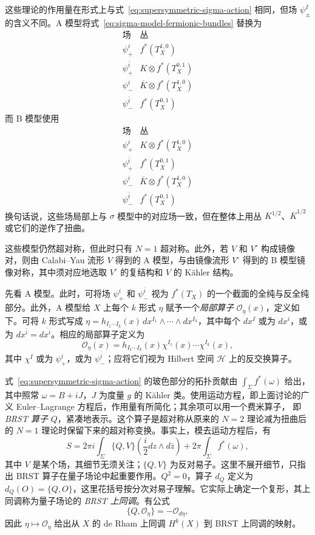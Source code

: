 这些理论的作用量在形式上与式~\eqref{eq:supersymmetric-sigma-action} 相同，但场 $\psi_\pm^I$ 的含义不同。A 模型将式~\eqref{eq:sigma-model-fermionic-bundles} 替换为
\[
\begin{array}{c|l}
\text{场}&\text{丛}\\\hline
\psi_+^i&f^*(T_X^{1,0})\\
\psi_+^{\bar i}&K\otimes f^*(T_X^{0,1})\\
\psi_-^i&\overline K\otimes f^*(T_X^{1,0})\\
\psi_-^{\bar i}&f^*(T_X^{0,1})
\end{array}
\]
而 B 模型使用
\[
\begin{array}{c|l}
\text{场}&\text{丛}\\\hline
\psi_+^i&K\otimes f^*(T_X^{1,0})\\
\psi_+^{\bar i}&f^*(T_X^{0,1})\\
\psi_-^i&\overline K\otimes f^*(T_X^{1,0})\\
\psi_-^{\bar i}&f^*(T_X^{0,1})
\end{array}
\]
换句话说，这些场局部上与 $\sigma$ 模型中的对应场一致，但在整体上用丛 $K^{1/2}$、$\overline K^{1/2}$ 或它们的逆作了扭曲。

这些模型仍然超对称，但此时只有 $N=1$ 超对称。此外，若 $V$ 和 $V^\circ$ 构成镜像对，则由 Calabi--Yau 流形 $V$ 得到的 A 模型，与由镜像流形 $V^\circ$ 得到的 B 模型镜像对称，其中须对应地选取 $V^\circ$ 的复结构和 $V$ 的 Kähler 结构。

先看 A 模型。此时，可将场 $\psi_+^i$ 和 $\psi_-^{\bar i}$ 视为 $f^*(T_X)$ 的一个截面的全纯与反全纯部分。此外，A 模型给 $X$ 上每个 $k$ 形式 $\eta$ 赋予一个\emph{局部算子} $\mathcal O_\eta(x)$，定义如下。可将 $k$ 形式写成 $\eta=h_{I_1\cdots I_k}(x)\,dx^{I_1}\wedge\cdots\wedge dx^{I_k}$，其中每个 $dx^I$ 或为 $dx^i$，或为 $dx^{\bar i}=d\overline{x^i}$。相应的局部算子定义为
\begin{equation}\label{eq:a-model-local-form-operator}
\mathcal O_\eta(x)=h_{I_1\cdots I_k}(x)\chi^{I_1}(x)\cdots\chi^{I_k}(x),
\end{equation}
其中 $\chi^I$ 或为 $\psi_+^i$，或为 $\psi_-^{\bar i}$；应将它们视为 Hilbert 空间 $\mathcal H$ 上的反交换算子。

式~\eqref{eq:supersymmetric-sigma-action} 的玻色部分的拓扑贡献由 $\int_\Sigma f^*(\omega)$ 给出，其中照常 $\omega=B+iJ$，$J$ 为度量 $g$ 的 Kähler 类。使用运动方程，即上面讨论的广义 Euler--Lagrange 方程后，作用量有所简化；其余项可以用一个费米算子，
即 \emph{BRST 算子} $Q$，紧凑地表示。这个算子是超对称从原来的 $N=2$ 理论减为扭曲后的 $N=1$ 理论时保留下来的超对称变换。事实上，模去运动方程后，有
\[
S=2\pi i\int_\Sigma\{Q,V\}\left(\frac i2dz\wedge d\bar z\right)
+2\pi\int_\Sigma f^*(\omega),
\]
其中 $V$ 是某个场，其细节无须关注；$\{Q,V\}$ 为反对易子。这里不展开细节，只指出 BRST 算子在量子场论中起重要作用。$Q^2=0$，算子 $d_Q$ 定义为 $d_Q(O)=\{Q,O\}$，这里花括号按分次对易子理解。它实际上确定一个复形，其上同调称为量子场论的 \emph{BRST 上同调}。有公式
\[
\{Q,\mathcal O_\eta\}=-\mathcal O_{d\eta},
\]
因此 $\eta\mapsto\mathcal O_\eta$ 给出从 $X$ 的 de Rham 上同调 $H^k(X)$ 到 BRST 上同调的映射。

